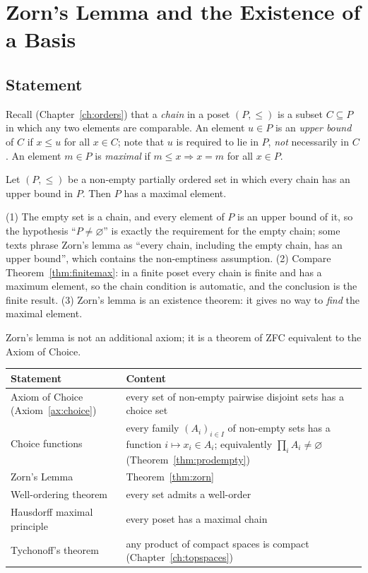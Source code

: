 \chapter{Zorn's Lemma and the Existence of a Basis}\label{ch:zorn}

\section{Statement}

Recall (Chapter~\ref{ch:orders}) that a \emph{chain} in a poset $(P,\le)$ is a subset $C\subseteq P$ in which any two elements are comparable. An element $u\in P$ is an \emph{upper bound} of $C$ if $x\le u$ for all $x\in C$; note that $u$ is required to lie in $P$, \emph{not} necessarily in $C$. An element $m\in P$ is \emph{maximal} if $m\le x\Rightarrow x=m$ for all $x\in P$.

\begin{theorem}\label{thm:zorn}
	Let $(P,\le)$ be a non-empty partially ordered set in which every chain has an upper bound in $P$. Then $P$ has a maximal element.
\end{theorem}

\begin{remark}
	(1) The empty set is a chain, and every element of $P$ is an upper bound of it, so the hypothesis ``$P\ne\varnothing$'' is exactly the requirement for the empty chain; some texts phrase Zorn's lemma as ``every chain, including the empty chain, has an upper bound'', which contains the non-emptiness assumption. (2) Compare Theorem~\ref{thm:finitemax}: in a finite poset every chain is finite and has a maximum element, so the chain condition is automatic, and the conclusion is the finite result. (3) Zorn's lemma is an existence theorem: it gives no way to \emph{find} the maximal element.
\end{remark}

Zorn's lemma is not an additional axiom; it is a theorem of ZFC equivalent to the Axiom of Choice.

\begin{center}
	\begin{tabular}{@{}p{5.6cm}p{9cm}@{}}
		\toprule
		\textbf{Statement} & \textbf{Content}\\
		\midrule
		Axiom of Choice (Axiom~\ref{ax:choice}) & every set of non-empty pairwise disjoint sets has a choice set\\
		Choice functions & every family $(A_i)_{i\in I}$ of non-empty sets has a function $i\mapsto x_i\in A_i$; equivalently $\prod_iA_i\ne\varnothing$ (Theorem~\ref{thm:prodempty})\\
		Zorn's Lemma & Theorem~\ref{thm:zorn}\\
		Well-ordering theorem & every set admits a well-order\\
		Hausdorff maximal principle & every poset has a maximal chain\\
		Tychonoff's theorem & any product of compact spaces is compact (Chapter~\ref{ch:topspaces})\\
		\bottomrule
	\end{tabular}
\end{center}

